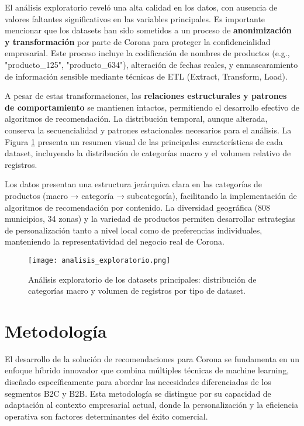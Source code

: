 \documentclass[twocolumn]{article}
\begin{document}
El análisis exploratorio reveló una alta calidad en los datos, con ausencia de valores faltantes significativos en las variables principales. Es importante mencionar que los datasets han sido sometidos a un proceso de \textbf{anonimización y transformación} por parte de Corona para proteger la confidencialidad empresarial. Este proceso incluye la codificación de nombres de productos (e.g., "producto\_125", "producto\_634"), alteración de fechas reales, y enmascaramiento de información sensible mediante técnicas de ETL (Extract, Transform, Load).

A pesar de estas transformaciones, las \textbf{relaciones estructurales y patrones de comportamiento} se mantienen intactos, permitiendo el desarrollo efectivo de algoritmos de recomendación. La distribución temporal, aunque alterada, conserva la secuencialidad y patrones estacionales necesarios para el análisis. La Figura \ref{fig:analisis_exploratorio} presenta un resumen visual de las principales características de cada dataset, incluyendo la distribución de categorías macro y el volumen relativo de registros.

Los datos presentan una estructura jerárquica clara en las categorías de productos (macro → categoría → subcategoría), facilitando la implementación de algoritmos de recomendación por contenido. La diversidad geográfica (808 municipios, 34 zonas) y la variedad de productos permiten desarrollar estrategias de personalización tanto a nivel local como de preferencias individuales, manteniendo la representatividad del negocio real de Corona.

\begin{figure}[H]
\centering
\texttt{[image: analisis\_exploratorio.png]}
\caption{Análisis exploratorio de los datasets principales: distribución de categorías macro y volumen de registros por tipo de dataset.}
\label{fig:analisis_exploratorio}
\end{figure}

\section{Metodología}

El desarrollo de la solución de recomendaciones para Corona se fundamenta en un enfoque híbrido innovador que combina múltiples técnicas de machine learning, diseñado específicamente para abordar las necesidades diferenciadas de los segmentos B2C y B2B. Esta metodología se distingue por su capacidad de adaptación al contexto empresarial actual, donde la personalización y la eficiencia operativa son factores determinantes del éxito comercial.
\end{document}
